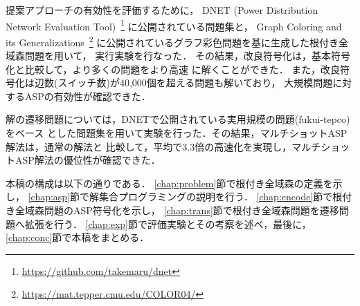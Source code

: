 提案アプローチの有効性を評価するために，
DNET (Power Distribution Network Evaluation Tool)~\footnote{%
\url{https://github.com/takemaru/dnet}}
に公開されている問題集と，
Graph Coloring and its Generalizations~\footnote{%
\url{https://mat.tepper.cmu.edu/COLOR04/}}
に公開されているグラフ彩色問題を基に生成した根付き全域森問題を用いて，
実行実験を行なった．
その結果，改良符号化は，基本符号化と比較して，より多くの問題をより高速
に解くことができた．
また，改良符号化は辺数(スイッチ数)が40,000個を超える問題も解いており，
大規模問題に対するASPの有効性が確認できた．

解の遷移問題については，DNETで公開されている実用規模の問題({\sf fukui-tepco})をベース
とした問題集を用いて実験を行った．その結果，マルチショットASP解法は，通常の解法と
比較して，平均で3.3倍の高速化を実現し，マルチショットASP解法の優位性が確認できた．


本稿の構成は以下の通りである．
\ref{chap:problem}節で根付き全域森の定義を示し，
\ref{chap:asp}節で解集合プログラミングの説明を行う．
\ref{chap:encode}節で根付き全域森問題のASP符号化を示し，
\ref{chap:trans}節で根付き全域森問題を遷移問題へ拡張を行う．
\ref{chap:exp}節で評価実験とその考察を述べ，最後に，
\ref{chap:conc}節で本稿をまとめる．

